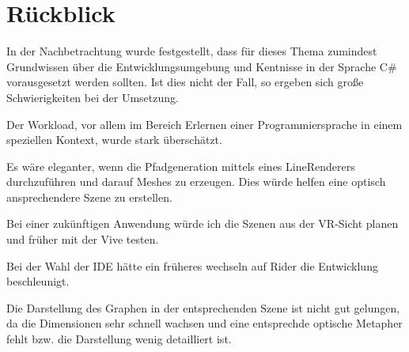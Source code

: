 \section{Rückblick}

In der Nachbetrachtung wurde festgestellt, dass für dieses Thema zumindest Grundwissen über die Entwicklungsumgebung und Kentnisse in der Sprache C\# vorausgesetzt werden sollten. Ist dies nicht der Fall, so ergeben sich große Schwierigkeiten bei der Umsetzung.

Der Workload, vor allem im Bereich \glqq Erlernen einer Programmiersprache in einem speziellen Kontext\grqq{}, wurde stark überschätzt.   

Es wäre eleganter, wenn die Pfadgeneration mittels eines LineRenderers durchzuführen und darauf Meshes zu erzeugen. Dies würde helfen eine optisch ansprechendere Szene zu erstellen.

Bei einer zukünftigen Anwendung würde ich die Szenen aus der VR-Sicht planen und früher mit der Vive testen.

Bei der Wahl der IDE hätte ein früheres wechseln auf Rider die Entwicklung beschleunigt.

Die Darstellung des Graphen in der entsprechenden Szene ist nicht gut gelungen, da die Dimensionen sehr schnell wachsen und eine entsprechde optische Metapher fehlt bzw. die Darstellung wenig detailliert ist. 





